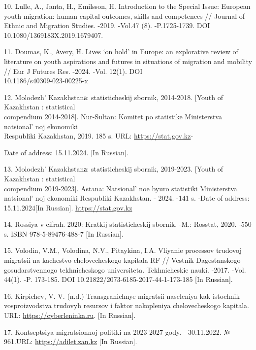 \begin{references}
10. Lulle, A., Janta, H., Emilsson, H. Introduction to the Special
Issue: European youth migration: human capital outcomes, skills and
competences // Journal of Ethnic and Migration Studies. -2019. -Vol.47
(8). -P.1725-1739. DOI 10.1080/1369183X.2019.1679407.

11. Doumas, K., Avery, H. Lives `on hold' in Europe: an explorative
review of literature on youth aspirations and futures in situations of
migration and mobility // Eur J Futures Res. -2024. -Vol. 12(1). DOI\\
10.1186/s40309-023-00225-x

12. Molodezh'{} Kazakhstanа: statisticheskij sbornik,
2014-2018. {[}Youth of Kazakhstan : statistical \\compendium 2014-2018{]}.
Nur-Sultan: Komitet po statistike Ministerstva
natsional' noj ekonomiki \\Respubliki Kazakhstan, 2019. 185
s. URL: \href{https://stat.gov.kz/api/iblock/element/184021/file/ru/}{https://stat.gov.kz}-

Date of address: 15.11.2024. {[}In Russian{]}.

13. Molodezh'{} Kazakhstanа: statisticheskij sbornik,
2019-2023. {[}Youth of Kazakhstan : statistical \\compendium 2019-2023{]}.
Astana: Natsional' noe byuro statistiki Ministerstva
natsional' noj ekonomiki Respubliki Kazakhstan. - 2024.
-141 s. -Date of address: 15.11.2024{[}In Russian{]}.
\href{https://stat.gov.kz/api/iblock/element/184021/file/ru/}{https://stat.gov.kz}

14. Rossiya v cifrah. 2020: Kratkij statisticheskij sbornik. -M.:
Rosstat, 2020. -550 s. ISBN 978-5-89476-488-7 {[}In Russian{]}.

15. Volodin, V.M., Volodina, N.V., Pitaykina, I.A. Vliyanie processov
trudovoj migratsii na kachestvo chelovecheskogo kapitala RF // Vestnik
Dagestanskogo gosudarstvennogo tekhnicheskogo universiteta.
Tekhnicheskie nauki. -2017. -Vol. 44(1). -P. 173-185. DOI
10.21822/2073-6185-2017-44-1-173-185 {[}In Russian{]}.

16. Kirpichev, V. V. (n.d.) Transgranichnye migratsii naseleniya kak
istochnik vosproizvodstva trudovyh resursov i faktor nakopleniya
chelovecheskogo kapitala. URL:
\href{https://cyberleninka.ru/article/n/transgranichnye-migratsii-naseleniya-kak-istochnik-vosproizvodstva-trudovyh-resursov-i-faktor-nakopleniya-chelovecheskogo-kapitala}{https://cyberleninka.ru}.
{[}In Russian{]}.

17. Kontseptsiya migratsionnoj politiki na 2023-2027 gody. - 30.11.2022.
№ 961.URL: \href{https://adilet.zan.kz/rus/docs/P2200000961}{https://adilet.zan.kz} {[}In Russian{]}.
\end{references}

